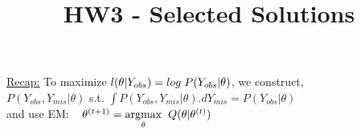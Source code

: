 \documentclass[12pt]{article}
\begin{document}
%
\title{HW3 - Selected Solutions}

\date{}

\maketitle

\uline{Recap:} To maximize $l({\theta}|Y_{obs}) = log\hspace{1 mm} P(Y_{obs}|\theta)$, we construct,\\

 $P(Y_{obs}, Y_{mis}|\theta)$ s.t. $\int P(Y_{obs}, Y_{mis}|\theta). dY_{mis} = P(Y_{obs}|\theta)$\\

and use EM: $\hspace{3 mm} \theta^{(t+1)}= \underset{\theta}{\operatorname{argmax}}\hspace{2 mm} Q(\theta|\theta^{(t)})$\\
\end{document}

